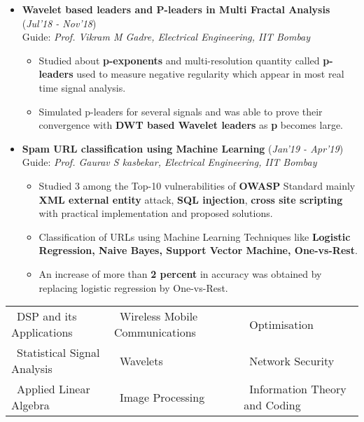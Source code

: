 \documentclass[10pt]{article}
\begin{document}
\begin{itemize}[leftmargin=0.4cm]
\item \textbf{Wavelet based leaders and P-leaders in Multi
Fractal Analysis} 
\hfill{(\textit{Jul'18 - Nov'18})}\\
Guide: \textit{Prof. Vikram M Gadre, Electrical Engineering, IIT Bombay}
	\begin{itemize}
	\item Studied about \textbf{p-exponents} and multi-resolution quantity called \textbf{p-leaders} used to measure negative regularity which appear in most real time signal analysis.
	\item Simulated p-leaders for several signals and was able to prove their convergence with \textbf{DWT based Wavelet leaders} as \textbf{p} becomes large.
	\end{itemize}
	

\item \textbf{Spam URL classification using Machine Learning}
\hfill{(\textit{Jan'19 - Apr'19})}\\
Guide: \textit{Prof. Gaurav S kasbekar, Electrical Engineering, IIT Bombay}

	\begin{itemize}
	\item Studied 3 among the Top-10 vulnerabilities of \textbf{OWASP} Standard mainly \textbf{XML external entity} attack, \textbf{SQL injection}, \textbf{cross site scripting} with practical implementation and proposed solutions.
	\item Classification of URLs using Machine Learning Techniques like \textbf{Logistic Regression, Naive Bayes, Support Vector Machine, One-vs-Rest}.
	\item An increase of more than \textbf{2 percent} in accuracy was obtained by replacing logistic regression by One-vs-Rest.
    \end{itemize}

	


\end{itemize}
\hspace{-0.17cm}\colorbox{bl}{}%
	 	
		\begin{tabular}{m{2.3in}m{2.3in}m{2.5in}}
		\hspace{0.55cm}\textbullet\ DSP and its Applications &  \textbullet\ Wireless Mobile Communications  & \textbullet\ Optimisation \\
		\hspace{0.55cm}\textbullet\ Statistical Signal Analysis & \textbullet\ Wavelets & \textbullet\ Network Security \\
		\hspace{0.55cm}\textbullet\ Applied Linear Algebra & \textbullet\ Image Processing & \textbullet\  Information Theory and Coding\\
	\end{tabular}
	
\end{document}
